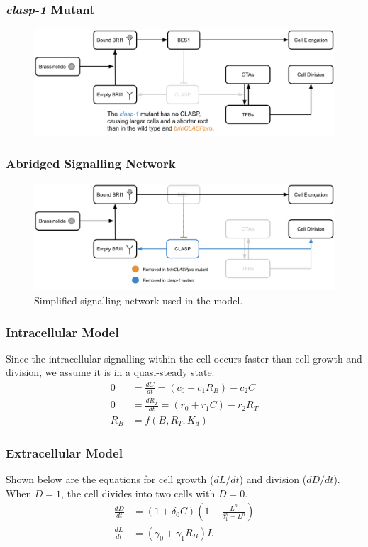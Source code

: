 \documentclass{beamer}
\begin{document}
\begin{frame}
\frametitle{\emph{clasp-1} Mutant}
\begin{figure}
  \centering
  \includegraphics[width=\textwidth]{network-clasp-1.png}
\end{figure}
\end{frame}

\begin{frame}
\frametitle{Abridged Signalling Network}
\begin{figure}
  \centering
  \includegraphics[width=\textwidth]{network-simplified.png}
  \caption{Simplified signalling network used in the model.}
\end{figure}
\end{frame}

\begin{frame}
\frametitle{Intracellular Model}

Since the intracellular signalling within the cell occurs faster than cell growth and division, we assume it is in a quasi-steady state.
$$
\begin{aligned}
  0 &= \frac{ dC }{ dt } = (c_{0} - c_{1}R_{B}) - c_{2}C \\[5pt]
  0 &= \frac{ dR_{T} }{ dt } = (r_{0}  + r_{1}C) - r_{2}R_{T} \\[5pt]
  R_{B} &= f(B, R_{T}, K_{d})
\end{aligned}
$$

\end{frame}

\begin{frame}
\frametitle{Extracellular Model}
Shown below are the equations for cell growth ($dL/dt$) and division ($dD/dt$). When $D = 1$, the cell divides into two cells with $D = 0$.
$$
\begin{aligned}
\frac{ dD }{ dt } &= (1 + \delta_{0}C) \left( 1 - \frac{ L^{ n } }{ \delta_{1}^{ n } + L^{ n } } \right)  \\[5pt]
\frac{ dL }{ dt } &= \left(\gamma_{0}  +  \gamma_{1}R_{B}\right)L  
\end{aligned}
$$
\end{frame}
\end{document}
